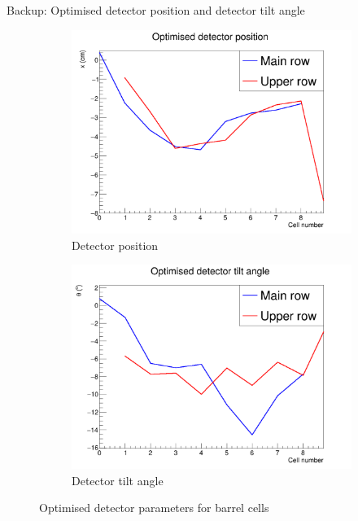 \documentclass{beamer}
\begin{document}
\begin{frame}{Backup: Optimised detector position and detector tilt angle}
  \begin{figure}
    \centering
    \vspace{-0.2cm}
    \begin{subfigure}{0.5\textwidth}
      \includegraphics[width = 1.0\textwidth]{Plots/OptimisedDetPosition.png}
      \caption{Detector position}
    \end{subfigure}%
    \begin{subfigure}{0.5\textwidth}
      \includegraphics[width = 1.0\textwidth]{Plots/OptimisedDetTilt.png}
      \caption{Detector tilt angle}
    \end{subfigure}
    \caption{Optimised detector parameters for barrel cells}
  \end{figure}
\end{frame}
\end{document}
